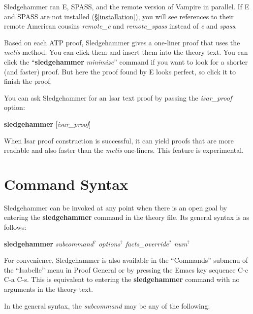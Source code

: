\documentclass[a4paper,12pt]{article}
\begin{document}
Sledgehammer ran E, SPASS, and the remote version of Vampire in parallel. If E
and SPASS are not installed (\S\ref{installation}), you will see references to
their remote American cousins \textit{remote\_e} and \textit{remote\_spass}
instead of \textit{e} and \textit{spass}.

Based on each ATP proof, Sledgehammer gives a one-liner proof that uses the
\textit{metis} method. You can click them and insert them into the theory text.
You can click the ``\textbf{sledgehammer} \textit{minimize}'' command if you
want to look for a shorter (and faster) proof. But here the proof found by E
looks perfect, so click it to finish the proof.

You can ask Sledgehammer for an Isar text proof by passing the
\textit{isar\_proof} option:

\prew
\textbf{sledgehammer} [\textit{isar\_proof}]
\postw

When Isar proof construction is successful, it can yield proofs that are more
readable and also faster than the \textit{metis} one-liners. This feature is
experimental.

\section{Command Syntax}
\label{command-syntax}

Sledgehammer can be invoked at any point when there is an open goal by entering
the \textbf{sledgehammer} command in the theory file. Its general syntax is as
follows:

\prew
\textbf{sledgehammer} \textit{subcommand\/$^?$ options\/$^?$ facts\_override\/$^?$ num\/$^?$}
\postw

For convenience, Sledgehammer is also available in the ``Commands'' submenu of
the ``Isabelle'' menu in Proof General or by pressing the Emacs key sequence C-c
C-a C-s. This is equivalent to entering the \textbf{sledgehammer} command with
no arguments in the theory text.

In the general syntax, the \textit{subcommand} may be any of the following:
\end{document}
